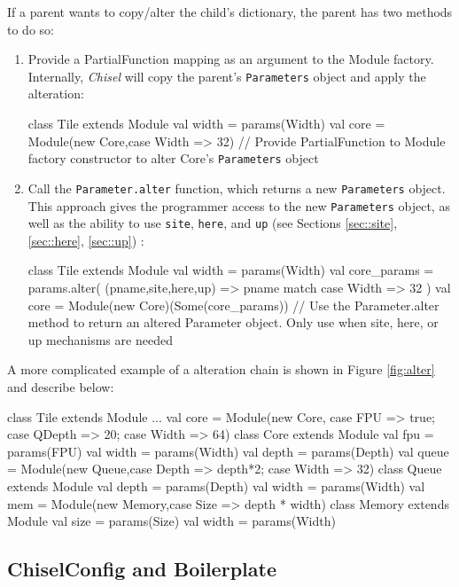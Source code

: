\documentclass[10pt,twocolumn]{article}
\def\code#1{{\small\tt #1}}
\begin{document}
If a parent wants to copy/alter the child's dictionary, the parent has two methods to do so:
\begin{enumerate}
  \item Provide a PartialFunction mapping as an argument to the Module factory. Internally, {\em Chisel} will copy the parent's \code{Parameters} object and apply the alteration:
\begin{scala}
class Tile extends Module { 
  val width = params(Width)
  val core = Module(new Core,{case Width => 32})
  // Provide PartialFunction to Module factory constructor to alter Core's \code{Parameters} object
}
\end{scala}
  \item Call the \code{Parameter.alter} function, which returns a new \code{Parameters} object. This approach gives the programmer access to the new \code{Parameters} object, as well as the ability to use \code{site}, \code{here}, and \code{up} (see Sections \ref{sec::site}, \ref{sec::here}, \ref{sec::up}) :
\begin{scala}
class Tile extends Module { 
  val width = params(Width)
  val core_params = params.alter(
    (pname,site,here,up) => pname match {
      case Width => 32
    })
  val core = Module(new Core)(Some(core_params))
  // Use the Parameter.alter method to return an altered Parameter object. Only use when site, here, or up mechanisms are needed
}
\end{scala}
\end{enumerate}
A more complicated example of a alteration chain is shown in Figure \ref{fig:alter} and describe below:
\begin{scala}
class Tile extends Module { 
  ...
  val core = Module(new Core, {case FPU => true; case QDepth => 20; case Width => 64})
}
class Core extends Module {
  val fpu = params(FPU)
  val width = params(Width)
  val depth = params(Depth)
  val queue = Module(new Queue,{case Depth => depth*2; case Width => 32})
}
class Queue extends Module {
  val depth = params(Depth)
  val width = params(Width)
  val mem = Module(new Memory,{case Size => depth * width})
}
class Memory extends Module {
  val size = params(Size)
  val width = params(Width)
}
\end{scala}

\subsection{ChiselConfig and Boilerplate}
\label{sec::config}
\end{document}
